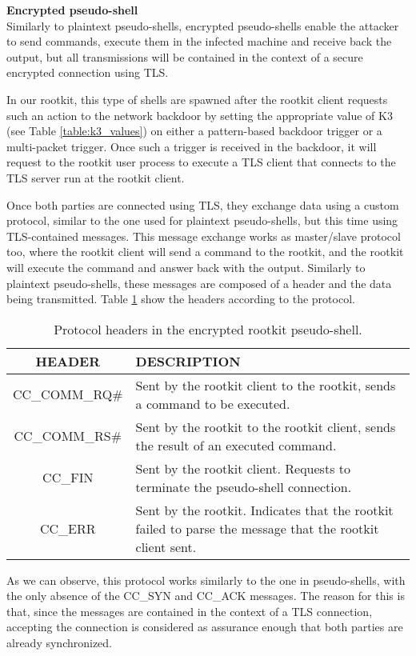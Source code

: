 \textbf{Encrypted pseudo-shell}\\
Similarly to plaintext pseudo-shells, encrypted pseudo-shells enable the attacker to send commands, execute them in the infected machine and receive back the output, but all transmissions will be contained in the context of a secure encrypted connection using TLS.

In our rootkit, this type of shells are spawned after the rootkit client requests such an action to the network backdoor by setting the appropriate value of K3 (see Table \ref{table:k3_values}) on either a pattern-based backdoor trigger or a multi-packet trigger. Once such a trigger is received in the backdoor, it will request to the rootkit user process to execute a TLS client that connects to the TLS server run at the rootkit client. 

Once both parties are connected using TLS, they exchange data using a custom protocol, similar to the one used for plaintext pseudo-shells, but this time using TLS-contained messages. This message exchange works as master/slave protocol too, where the rootkit client will send a command to the rootkit, and the rootkit will execute the command and answer back with the output. Similarly to plaintext pseudo-shells, these messages are composed of a header and the data being transmitted. Table \ref{table:eps_headers} show the headers according to the protocol.

\begin{table}[htbp]
\begin{tabular}{|c|>{\centering\arraybackslash}p{8cm}|}
\hline
\textbf{HEADER} & \textbf{DESCRIPTION}\\
\hline
\hline
CC\_COMM\_RQ\# & Sent by the rootkit client to the rootkit, sends a command to be executed.\\
\hline
CC\_COMM\_RS\# & Sent by the rootkit to the rootkit client, sends the result of an executed command.\\
\hline
CC\_FIN & Sent by the rootkit client. Requests to terminate the pseudo-shell connection.\\
\hline
CC\_ERR & Sent by the rootkit. Indicates that the rootkit failed to parse the message that the rootkit client sent.\\
\hline
\end{tabular}
\caption{Protocol headers in the encrypted rootkit pseudo-shell.}
\label{table:eps_headers}
\end{table}

As we can observe, this protocol works similarly to the one in pseudo-shells, with the only absence of the CC\_SYN and CC\_ACK messages. The reason for this is that, since the messages are contained in the context of a TLS connection, accepting the connection is considered as assurance enough that both parties are already synchronized.



